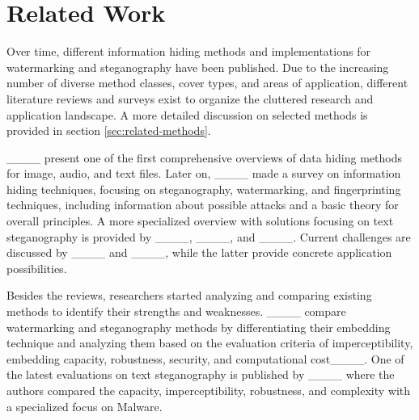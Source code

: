 \section{Related Work}
\label{sec:related-work}
	Over time, different information hiding methods and implementations for watermarking and steganography have been published. Due to the increasing number of diverse method classes, cover types, and areas of application, different literature reviews and surveys exist to organize the cluttered research and application landscape. A more detailed discussion on selected methods is provided in section \ref{sec:related-methods}.
	
	____ present one of the first comprehensive overviews of data hiding methods for image, audio, and text files. Later on, ____ made a survey on information hiding techniques, focusing on steganography, watermarking, and fingerprinting techniques, including information about possible attacks and a basic theory for overall principles. A more specialized overview with solutions focusing on text steganography is provided by ____, ____, and ____. Current challenges are discussed by ____ and ____, while the latter provide concrete application possibilities.
	
	Besides the reviews, researchers started analyzing and comparing existing methods to identify their strengths and weaknesses. ____ compare watermarking and steganography methods by differentiating their embedding technique and analyzing them based on the evaluation criteria of imperceptibility, embedding capacity, robustness, security, and computational cost____. One of the latest evaluations on text steganography is published by ____ where the authors compared the capacity, imperceptibility, robustness, and complexity with a specialized focus on Malware.
	
